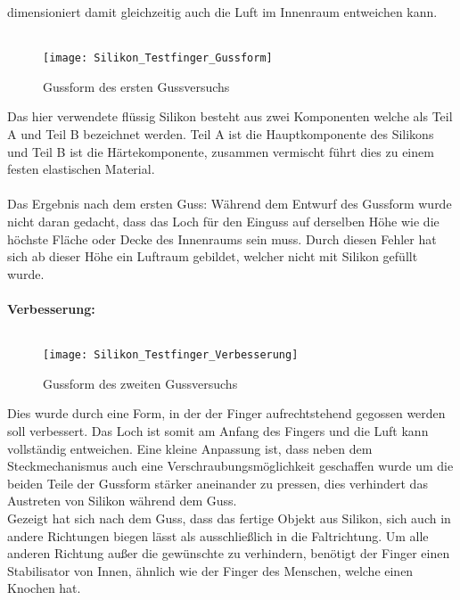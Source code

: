 \documentclass[titlepage,12pt,twoside]{article}
\begin{document}
dimensioniert damit gleichzeitig auch die Luft im Innenraum entweichen kann. \\
\\
\begin{figure}[H]
	\begin{center}
		\scalebox{0.8}
		{\texttt{[image: Silikon\_Testfinger\_Gussform]}}
		\caption{Gussform des ersten Gussversuchs}
		\label{fig:Silikon_Testfinger_Gussform}			
	\end{center}
\end{figure}
\hfill \break
Das hier verwendete flüssig Silikon besteht aus zwei Komponenten welche als Teil A und Teil B bezeichnet werden. Teil A ist die Hauptkomponente des Silikons und Teil B ist die Härtekomponente, zusammen vermischt führt dies zu einem festen elastischen 
Material. \\
\\
Das Ergebnis nach dem ersten Guss: Während dem Entwurf des Gussform wurde nicht daran gedacht, dass das Loch für den Einguss auf derselben Höhe wie die höchste Fläche oder Decke des Innenraums sein muss. Durch diesen Fehler hat sich ab dieser Höhe 
ein Luftraum gebildet, welcher nicht mit Silikon gefüllt wurde. \\
\\
\textbf{Verbesserung:} \\
\\
\begin{figure}[H]
	\begin{center}
		\scalebox{0.8}
		{\texttt{[image: Silikon\_Testfinger\_Verbesserung]}}
		\caption{Gussform des zweiten Gussversuchs}
		\label{fig:Silikon_Testfinger_Verbesserung}			
	\end{center}
\end{figure}
\hfill \break
Dies wurde durch eine Form, in der der Finger aufrechtstehend gegossen werden soll verbessert. Das Loch ist somit am Anfang des Fingers und die Luft kann vollständig entweichen. Eine kleine Anpassung ist, dass neben dem Steckmechanismus auch eine 
Verschraubungsmöglichkeit geschaffen wurde um die beiden Teile der Gussform stärker aneinander zu pressen, dies verhindert das Austreten von Silikon während dem Guss. \\
Gezeigt hat sich nach dem Guss, dass das fertige Objekt aus Silikon, sich auch in andere Richtungen biegen lässt als ausschließlich in die Faltrichtung. Um alle anderen Richtung außer die gewünschte zu verhindern, benötigt der Finger einen 
Stabilisator von Innen, ähnlich wie der Finger des Menschen, welche einen Knochen hat. \\
\\
\end{document}
